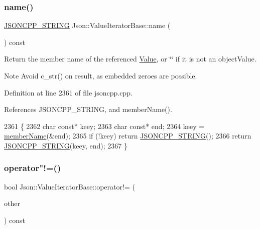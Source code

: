 \subsubsection{\texorpdfstring{name()}{name()}}
{\footnotesize\ttfamily \hyperlink{json_8h_a1e723f95759de062585bc4a8fd3fa4be}{J\+S\+O\+N\+C\+P\+P\+\_\+\+S\+T\+R\+I\+NG} Json\+::\+Value\+Iterator\+Base\+::name (\begin{DoxyParamCaption}{ }\end{DoxyParamCaption}) const}

Return the member name of the referenced \hyperlink{class_json_1_1_value}{Value}, or \char`\"{}\char`\"{} if it is not an object\+Value. \begin{DoxyNote}{Note}
Avoid {\ttfamily c\+\_\+str()} on result, as embedded zeroes are possible. 
\end{DoxyNote}


Definition at line 2361 of file jsoncpp.\+cpp.



References J\+S\+O\+N\+C\+P\+P\+\_\+\+S\+T\+R\+I\+NG, and member\+Name().


\begin{DoxyCode}
2361                                              \{
2362   \textcolor{keywordtype}{char} \textcolor{keyword}{const}* keey;
2363   \textcolor{keywordtype}{char} \textcolor{keyword}{const}* end;
2364   keey = \hyperlink{class_json_1_1_value_iterator_base_a54765da6759fd3f1edcbfbaf308ec263}{memberName}(&end);
2365   \textcolor{keywordflow}{if} (!keey) \textcolor{keywordflow}{return} \hyperlink{json_8h_a1e723f95759de062585bc4a8fd3fa4be}{JSONCPP\_STRING}();
2366   \textcolor{keywordflow}{return} \hyperlink{json_8h_a1e723f95759de062585bc4a8fd3fa4be}{JSONCPP\_STRING}(keey, end);
2367 \}
\end{DoxyCode}
\mbox{\label{class_json_1_1_value_iterator_base_aa83bdcc8114b7d040eb8eb42eeed5f4a}} 
\subsubsection{\texorpdfstring{operator"!=()}{operator!=()}}
{\footnotesize\ttfamily bool Json\+::\+Value\+Iterator\+Base\+::operator!= (\begin{DoxyParamCaption}\item[{const \hyperlink{class_json_1_1_value_iterator_base_a9d2a940d03ea06d20d972f41a89149ee}{Self\+Type} \&}]{other }\end{DoxyParamCaption}) const\hspace{0.3cm}{\ttfamily [inline]}}




